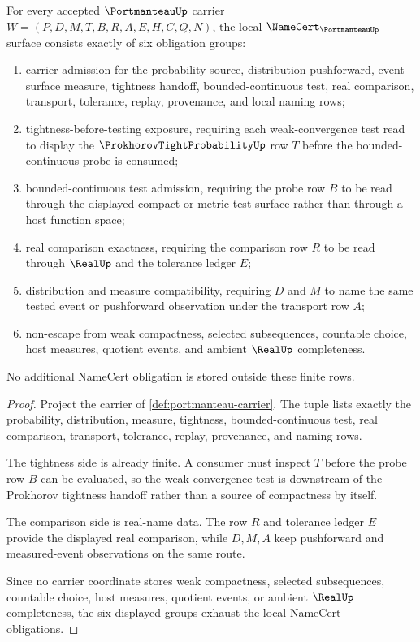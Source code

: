 \begin{theorem}
\label{thm:portmanteau-namecert-obligations}
For every accepted $\PortmanteauUp$ carrier $W=(P,D,M,T,B,R,A,E,H,C,Q,N)$, the local $\NameCert_{\PortmanteauUp}$ surface consists exactly of six obligation groups:
\begin{enumerate}
\item carrier admission for the probability source, distribution pushforward, event-surface measure, tightness handoff, bounded-continuous test, real comparison, transport, tolerance, replay, provenance, and local naming rows;
\item tightness-before-testing exposure, requiring each weak-convergence test read to display the $\ProkhorovTightProbabilityUp$ row $T$ before the bounded-continuous probe is consumed;
\item bounded-continuous test admission, requiring the probe row $B$ to be read through the displayed compact or metric test surface rather than through a host function space;
\item real comparison exactness, requiring the comparison row $R$ to be read through $\RealUp$ and the tolerance ledger $E$;
\item distribution and measure compatibility, requiring $D$ and $M$ to name the same tested event or pushforward observation under the transport row $A$;
\item non-escape from weak compactness, selected subsequences, countable choice, host measures, quotient events, and ambient $\RealUp$ completeness.
\end{enumerate}
No additional NameCert obligation is stored outside these finite rows.
\end{theorem}
\begin{proof}
Project the carrier of \autoref{def:portmanteau-carrier}. The tuple lists exactly the probability, distribution, measure, tightness, bounded-continuous test, real comparison, transport, tolerance, replay, provenance, and naming rows.

The tightness side is already finite. A consumer must inspect $T$ before the probe row $B$ can be evaluated, so the weak-convergence test is downstream of the Prokhorov tightness handoff rather than a source of compactness by itself.

The comparison side is real-name data. The row $R$ and tolerance ledger $E$ provide the displayed real comparison, while $D,M,A$ keep pushforward and measured-event observations on the same route.

Since no carrier coordinate stores weak compactness, selected subsequences, countable choice, host measures, quotient events, or ambient $\RealUp$ completeness, the six displayed groups exhaust the local NameCert obligations.
\end{proof}

